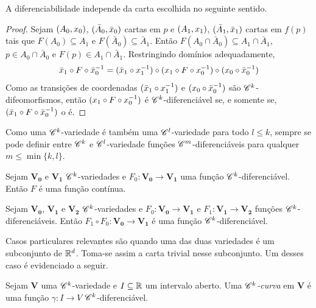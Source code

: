 A diferenciabilidade independe da carta escolhida no seguinte sentido.

\begin{proof}
Sejam $(A_0,x_0)$, $(\bar A_0,\bar{x}_0)$ cartas em $p$ e $(A_1,x_1)$, $(\bar A_1,\bar{x}_1)$ cartas em $f(p)$ tais que $F(A_0) \subseteq A_1$ e $F(\bar A_0) \subseteq \bar A_1$. Então $F(A_0 \cap \bar A_0) \subseteq A_1 \cap \bar A_1$, $p \in A_0 \cap \bar A_0$ e $F(p) \in A_1 \cap \bar A_1$. Restringindo domínios adequadamente,
	\begin{equation*}
	\bar {x}_1 \circ F \circ \bar {x}_0^{-1} = (\bar {x}_1 \circ x_1^{-1}) \circ (x_1 \circ F \circ x_0 ^{-1}) \circ (x_0 \circ \bar {x}_0^{-1})
	\end{equation*}
Como as transições de coordenadas $(\bar {x}_1 \circ x_1^{-1})$ e $(x_0 \circ \bar {x}_0^{-1})$ são $\mathscr{C}^k$-difeomorfismos, então $(x_1 \circ F \circ x_0 ^{-1})$ é $\mathscr{C}^k$-diferenciável se, e somente se, $(\bar {x}_1 \circ F \circ \bar {x}_0^{-1})$ o é.
\end{proof}

Como uma $\mathscr{C}^k$-variedade é também uma $\mathscr{C}^l$-variedade para todo $l\leq k$, sempre se pode definir entre $\mathscr{C}^k$ e $\mathscr{C}^l$-variedade funções $\mathscr{C}^m$-diferenciáveis para qualquer $m \leq \min\{k,l\}$.

\begin{proposition}
Sejam $\bm{V_0}$ e $\bm{V_1}$ $\mathscr{C}^k$-variedades e $F_0: \bm{V_0} \to \bm{V_1}$ uma função $\mathscr{C}^k$-diferenciável. Então $F$ é uma função contínua.
\end{proposition}

\begin{proposition}
Sejam $\bm{V_0}$, $\bm{V_1}$ e $\bm{V_2}$ $\mathscr{C}^k$-variedades e $F_0: \bm{V_0} \to \bm{V_1}$ e $F_1: \bm{V_1} \to \bm{V_2}$ funções $\mathscr{C}^k$-diferenciáveis. Então $F_1 \circ F_0: \bm{V_0} \to \bm{V_1}$ é uma função $\mathscr{C}^k$-diferenciável.
\end{proposition}

Casos particulares relevantes são quando uma das duas variedades é um subconjunto de $\mathbb{R}^d$. Toma-se assim a carta trivial nesse subconjunto. Um desses caso é evidenciado a seguir.

\begin{definition}
Sejam $\bm V$ uma $\mathscr{C}^k$-variedade e $I \subseteq \mathbb{R}$ um intervalo aberto. Uma \emph{$\mathscr{C}^k$-curva} em $\bm V$ é uma função $\gamma: I \to V$ $\mathscr{C}^k$-diferenciável.
\end{definition}


